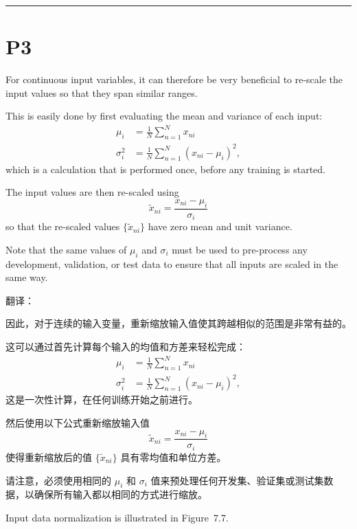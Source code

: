 \documentclass{article}
\begin{document}
\noindent\rule{\linewidth}{0.4pt}

\section{P3}

For continuous input variables, it can therefore be very beneficial to re-scale the input values so that they span similar ranges. 

This is easily done by first evaluating the mean and variance of each input:
\begin{align}
    \mu_i &= \frac{1}{N} \sum_{n=1}^N x_{ni} \tag{7.48} \\
    \sigma_i^2 &= \frac{1}{N} \sum_{n=1}^N (x_{ni} - \mu_i)^2, \tag{7.49}
\end{align}
which is a calculation that is performed once, before any training is started. 

The input values are then re-scaled using
\begin{equation}
    \widetilde{x}_{ni} = \frac{x_{ni} - \mu_i}{\sigma_i} \tag{7.50}
\end{equation}
so that the re-scaled values $\{\widetilde{x}_{ni}\}$ have zero mean and unit variance. 

Note that the same values of $\mu_i$ and $\sigma_i$ must be used to pre-process any development, validation, or test data to ensure that all inputs are scaled in the same way. 

{\color{red}
翻译：

因此，对于连续的输入变量，重新缩放输入值使其跨越相似的范围是非常有益的。

这可以通过首先计算每个输入的均值和方差来轻松完成：
\begin{align}
    \mu_i &= \frac{1}{N} \sum_{n=1}^N x_{ni} \tag{7.48} \\
    \sigma_i^2 &= \frac{1}{N} \sum_{n=1}^N (x_{ni} - \mu_i)^2, \tag{7.49}
\end{align}
这是一次性计算，在任何训练开始之前进行。

然后使用以下公式重新缩放输入值
\begin{equation}
    \widetilde{x}_{ni} = \frac{x_{ni} - \mu_i}{\sigma_i} \tag{7.50}
\end{equation}
使得重新缩放后的值 $\{\widetilde{x}_{ni}\}$ 具有零均值和单位方差。

请注意，必须使用相同的 $\mu_i$ 和 $\sigma_i$ 值来预处理任何开发集、验证集或测试集数据，以确保所有输入都以相同的方式进行缩放。
}

Input data normalization is illustrated in Figure~7.7.
\end{document}
